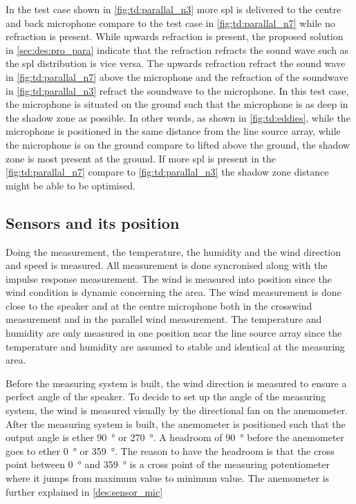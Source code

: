 In the test case shown in \autoref{fig:td:parallal_n3} more \gls{spl} is delivered to the centre and back microphone compare to the test case in  \autoref{fig:td:parallal_n7} while no refraction is present. While upwards refraction is present, the proposed solution in \autoref{sec:des:pro_para} indicate that the refraction refracts the sound wave such as the \gls{spl} distribution is vice versa. The upwards refraction refract the sound wave in \autoref{fig:td:parallal_n7} above the microphone and the refraction of the soundwave in \autoref{fig:td:parallal_n3} refract the soundwave to the microphone. In this test case, the microphone is situated on the ground such that the microphone is as deep in the shadow zone as possible. In other words, as shown in \autoref{fig:td:eddies}, while the microphone is positioned in the same distance from the line source array, while the microphone is on the ground compare to lifted above the ground, the shadow zone is most present at the ground. If more \gls{spl} is present in the \autoref{fig:td:parallal_n7} compare to \autoref{fig:td:parallal_n3} the shadow zone distance might be able to be optimised.

\subsection{Sensors and its position}
Doing the measurement, the temperature, the humidity and the wind direction and speed is measured. All measurement is done syncronised along with the impulse response measurement. The wind is measured into position since the wind condition is dynamic concerning the area. The wind measurement is done close to the speaker and at the centre microphone both in the crosswind measurement and in the parallel wind measurement. The temperature and humidity are only measured in one position near the line source array since the temperature and humidity are assumed to stable and identical at the measuring area. 

Before the measuring system is built, the wind direction is measured to ensure a perfect angle of the speaker. To decide to set up the angle of the measuring system, the wind is measured visually by the directional fan on the anemometer. After the measuring system is built, the anemometer is positioned such that the output angle is ether \SI{90}{\degree} or \SI{270}{\degree}. A headroom of \SI{90}{\degree} before the anemometer goes to ether \SI{0}{\degree} or \SI{359}{\degree}. The reason to have the headroom is that the cross point between \SI{0}{\degree} and \SI{359}{\degree} is a cross point of the measuring potentiometer where it jumps from maximum value to minimum value. The anemometer is further explained in \autoref{des:sensor_mic}


